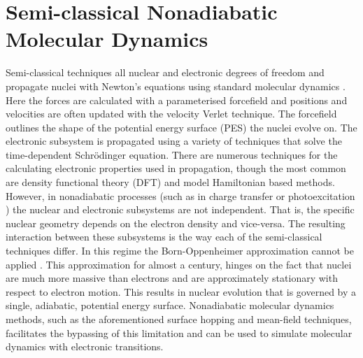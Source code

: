 \section{Semi-classical Nonadiabatic Molecular Dynamics}
Semi-classical techniques all  nuclear and electronic degrees of freedom  and propagate nuclei with Newton's equations using standard molecular dynamics \cite{Coker1995Jan}. Here the forces are calculated with a parameterised forcefield and positions and velocities are often updated with the velocity Verlet technique. The forcefield outlines the shape of the potential energy surface (PES) the nuclei evolve on. The electronic subsystem is propagated using a variety of techniques that solve the time-dependent Schr\"odinger equation. There are numerous techniques for the calculating electronic properties used in propagation, though the most common are density functional theory (DFT) and model Hamiltonian based methods. However, in nonadiabatic processes (such as in charge transfer \cite{PhysRevB.79.115203} or photoexcitation \cite{Hammes-Schiffer2001Apr, Hammes-Schiffer1994Sep, Huynh2007}) the nuclear and electronic subsystems are not independent. That is, the specific nuclear geometry depends on the electron density and vice-versa. The resulting interaction between these  subsystems is the way each of the semi-classical techniques differ. In this regime the Born-Oppenheimer approximation cannot be applied \cite{john_c._tully_nonadiabatic_nodate}. This approximation for almost a century, \cite{Pisana2007Feb} hinges on the fact that nuclei are much more massive than electrons and are approximately stationary with respect to electron motion\cite{Born1927Jan}. This results in nuclear evolution that is governed by a single, adiabatic, potential energy surface. Nonadiabatic molecular dynamics methods, such as the aforementioned surface hopping and mean-field techniques, facilitates the bypassing of this limitation and can be used to simulate molecular dynamics with electronic transitions.  \cite{Hund1927, Neumann1929, Kemble1929, doi:10.1098/rspa.1932.0165}
\\\\

